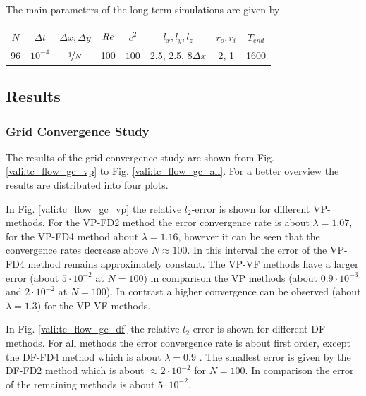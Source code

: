 The main parameters of the long-term simulations are  given by

\begin{center}
\vspace*{0.7ex}
\begin{tabular}{c|c|c|c|c|c|c|c }
 $ N  $                   & $\Delta t$ & $\Delta x, \Delta y$            & $\mbox{\textit{Re}}$  & $c^2$   & $l_x, l_y, l_z$ &$r_o, r_i$ & $T_{end}$\\
\hline
 $96 $& $10^{-4}$ & $\nicefrac{1}{N}$ & 100     & $100$   & 2.5, 2.5, 8$\Delta x$   & 2, 1& 1600\\
\end{tabular}
\vspace*{0.7ex}
\end{center}

\clearpage

\subsection{Results}

\subsubsection{Grid Convergence Study}


The results of the grid convergence study are shown from Fig. \ref{vali:tc_flow_gc_vp} to Fig. \ref{vali:tc_flow_gc_all}.
For a better overview the results are distributed into four plots.

In Fig. \ref{vali:tc_flow_gc_vp} the relative $l_2$-error is shown for different VP-methods.
For the VP-FD2 method the error convergence rate is about $\lambda=1.07$,
for the VP-FD4 method about $\lambda=1.16$, however it can be seen that the convergence rates decrease above $N\approx100$.
In this interval the error of the VP-FD4 method remains approximately constant.
The VP-VF methods have a larger error (about $5\cdot 10^{-2}$ at $N=100$) in comparison the VP methods (about $0.9 \cdot 10^{-3}$ and  $2\cdot10^{-2}$ at $N=100$).
In contrast a higher convergence can be observed (about $\lambda=1.3$) for the VP-VF methods.

In Fig. \ref{vali:tc_flow_gc_df} the relative $l_2$-error is shown for different DF-methods.
For all methods the error convergence rate is about first order, except the DF-FD4 method which is about $\lambda=0.9$ .
The smallest error is given by the DF-FD2 method which is about $\approx 2 \cdot 10^{-2}$ for $N=100$.
In comparison the error of the remaining methods is about $5\cdot10^{-2}$.

